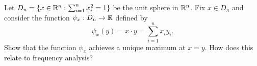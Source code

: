 \begin{problem}
Let $D_n = \{x \in \mathbb{R}^n : \sum_{i=1}^n x_i^2 = 1\}$ be the unit sphere
in $\mathbb{R}^n$.  Fix $x \in D_n$ and consider the function $\psi_x : D_n
\to \mathbb{R}$ defined by
\[
\psi_x(y) = x \cdot y = \sum_{i=1}^n x_i y_i.
\]
Show that the function $\psi_x$ achieves a unique maximum at $x=y$.
How does this relate to frequency analysis?
\end{problem}

\begin{Answer}

\end{Answer}
